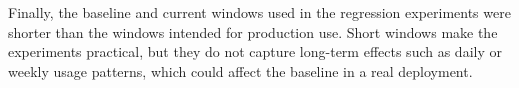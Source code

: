 Finally, the baseline and current windows used in the regression experiments were shorter than the windows intended for production use. Short windows make the experiments practical, but they do not capture long-term effects such as daily or weekly usage patterns, which could affect the baseline in a real deployment.
